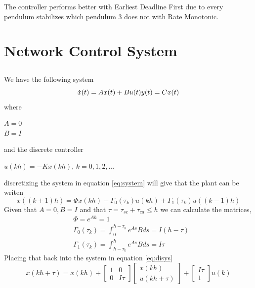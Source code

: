 \documentclass[12pt,a4paper]{article}
\begin{document}
\subsection{}
The controller performs better with Earliest Deadline First due to every pendulum stabilizes which pendulum 3 does not with Rate Monotonic. 





\section{Network Control System}
\subsection{} %
We have the following system
  \begin{equation}
    \dot{x}(t) = Ax(t)+Bu(t) \\
    y(t) = Cx(t)
    \label{eq:system}
  \end{equation}
where
\begin{center}
$A=0$ \\
$B=I$
\end{center}
and the discrete controller
\begin{center}
$u(kh) = -Kx(kh)$,    $k = 0,1,2,...$
\end{center}
discretizing the system in equation \ref{eq:system} will give that the
plant can be writen
\begin{equation}
    x((k+1)h)=\Phi x(kh)+\Gamma_{0}(\tau_{k})u(kh)+\Gamma_{1}(\tau_{k})u((k-1)h)
    \label{eq:disys}
\end{equation}
Given that $A=0, B=I$ and that $\tau = \tau_{sc}+\tau_{ca}\le h$ we can
calculate the matrices,
\begin{align*}
    &\Phi=e^{Ah}=1 \\
    &\Gamma_{0}(\tau_{k})=\int_{0}^{h-\tau_{k}}e^{As}Bds=I(h-\tau) \\
    &\Gamma_{1}(\tau_{k})=\int_{h-\tau_{k}}^{h}e^{As}Bds=I\tau
\end{align*}
Placing that back into the system in equation \ref{eq:disys}
\begin{equation}
  x(kh+\tau)=x(kh)+
  \begin{bmatrix}
    1 & 0 \\
    0 & I\tau
  \end{bmatrix}
  \begin{bmatrix}
    x(kh) \\
    u(kh+\tau)
  \end{bmatrix}
  +
  \begin{bmatrix}
    I\tau \\
    1
  \end{bmatrix}
  u(k)
\end{equation}
\end{document}
